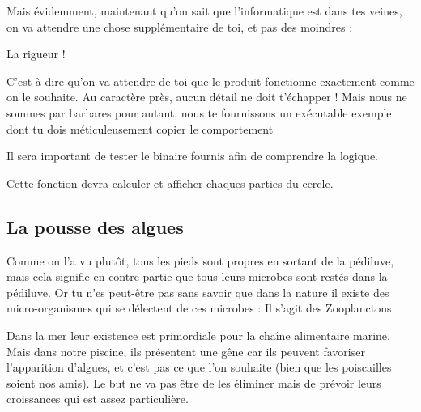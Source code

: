 \documentclass[a4paper, 12pt]{article}
\begin{document}
{    

    Mais évidemment, maintenant qu'on sait que l'informatique est dans tes veines, on va attendre
    une chose supplémentaire de toi, et pas des moindres :
    \newline \newline
    \begin{center}
        {\huge La rigueur !}
    \end{center}
    \vspace{1cm}
    
    C'est à dire qu'on va attendre de toi que le produit fonctionne exactement comme on le souhaite.
    Au caractère près, aucun détail ne doit t'échapper !
    \newline \newline
    Mais nous ne sommes par barbares pour autant, nous te fournissons un exécutable exemple dont tu dois
    méticuleusement copier le comportement



    Il sera important de tester le binaire fournis afin de comprendre la logique.

    Cette fonction devra calculer et afficher chaques parties du cercle.
    
    \vspace{2cm}

    \subsection{La pousse des algues}

    Comme on l'a vu plutôt, tous les pieds sont propres en sortant de la pédiluve, mais cela signifie en contre-partie
    que tous leurs microbes sont restés dans la pédiluve. Or tu n'es peut-être pas sans savoir que dans la nature
    il existe des micro-organismes qui se délectent de ces microbes : Il s'agit des Zooplanctons.
    \newline \newline


    Dans la mer leur existence est primordiale pour la chaîne alimentaire marine. Mais dans notre piscine, ils présentent une gêne
    car ils peuvent favoriser l'apparition d'algues, et c'est pas ce que l'on souhaite (bien que les poiscailles soient nos amis).
    Le but ne va pas être de les éliminer mais de prévoir leurs croissances qui est assez particulière.
    \newline\newline

}
\end{document}
